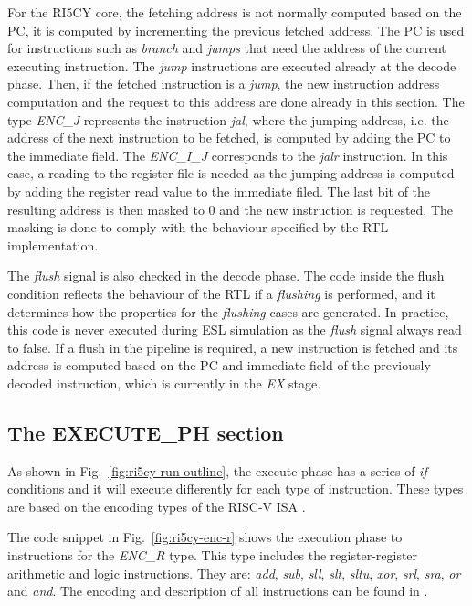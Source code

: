 For the RI5CY core, the fetching address is not normally computed based on the PC, it is computed by incrementing the previous fetched address. The PC is used for instructions such as \textit{branch} and \textit{jumps} that need the address of the current executing instruction. The \textit{jump} instructions are executed already at the decode phase. Then, if the fetched instruction is a \textit{jump}, the new instruction address computation and the request to this address are done already in this section. The type \textit{ENC\_J} represents the instruction \textit{jal}, where the jumping address, i.e. the address of the next instruction to be fetched, is computed by adding the PC to the immediate field. The \textit{ENC\_I\_J} corresponds to the \textit{jalr} instruction. In this case, a reading to the register file is needed as the jumping address is computed by adding the register read value to the immediate filed. The last bit of the resulting address is then masked to 0 and the new instruction is requested. The masking is done to comply with the behaviour specified by the RTL implementation. 

The \textit{flush} signal is also checked in the decode phase. The code inside the flush condition reflects the behaviour of the RTL if a \textit{flushing} is performed, and it determines how the properties for the \textit{flushing} cases are generated. In practice, this code is never executed during ESL simulation as the \textit{flush} signal always read to false. If a flush in the pipeline is required, a new instruction is fetched and its address is computed based on the PC and immediate field of the previously decoded instruction, which is currently in the \textit{EX} stage. 

\subsection*{The EXECUTE\_PH section}

As shown in Fig.~\ref{fig:ri5cy-run-outline}, the execute phase has a series of \textit{if} conditions and it will execute differently for each type of instruction. These types are based on the encoding types of the RISC-V ISA \cite{spec-riscv}.

The code snippet in Fig.~\ref{fig:ri5cy-enc-r} shows the execution phase to instructions for the \textit{ENC\_R} type. This type includes the register-register arithmetic and logic instructions. They are: \textit{add}, \textit{sub}, \textit{sll}, \textit{slt}, \textit{sltu}, \textit{xor}, \textit{srl}, \textit{sra}, \textit{or} and \textit{and}. The encoding and description of all instructions can be found in \cite{spec-riscv}. 

